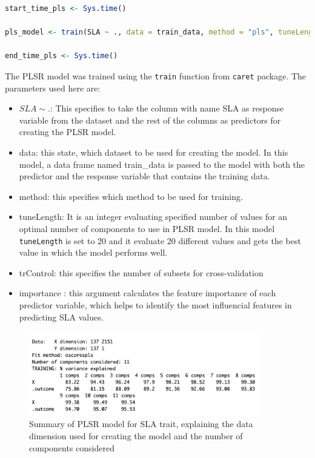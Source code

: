 \documentclass[12pt,a4paper]{report}
\begin{document}
\begin{lstlisting}[language=R, style=mystyle]
start_time_pls <- Sys.time()

pls_model <- train(SLA ~ ., data = train_data, method = "pls", tuneLength = 20, trControl = train_control, importance = TRUE)

end_time_pls <- Sys.time()
\end{lstlisting}

The PLSR model was trained using the \texttt{train} function from \texttt{caret} package. The parameters used here are:
\begin{itemize}
    \item $SLA \sim .$: This specifies to take the column with name SLA as response variable from the dataset and the rest of the columns as predictors for creating the PLSR model.
    \item data: this state, which dataset to be used for creating the model. In this model, a data frame named train\_data is passed to the model with both the predictor and the response variable that contains the training data.
    \item method: this specifies which method to be used for training.
    \item tuneLength: It is an integer evaluating specified number of values for an optimal number of components to use in PLSR model. In this model \texttt{tuneLength} is set to 20 and it evaluate 20 different values and gets the best value in which the model performs well. 
    \item trControl: this specifies the number of subsets for cross-validation 
    \item importance : this argument calculates the feature importance of each predictor variable, which helps to identify the most influencial features in predicting SLA values.
\end{itemize}

\begin{figure}[h]
    \centering
    \includegraphics[width=0.9\textwidth]{Figures/plsr_model.png}
    \caption{Summary of PLSR model for SLA trait, explaining the data dimension used for creating the model and the number of components considered}
    \label{fig:plsr_model}
\end{figure}
\end{document}
